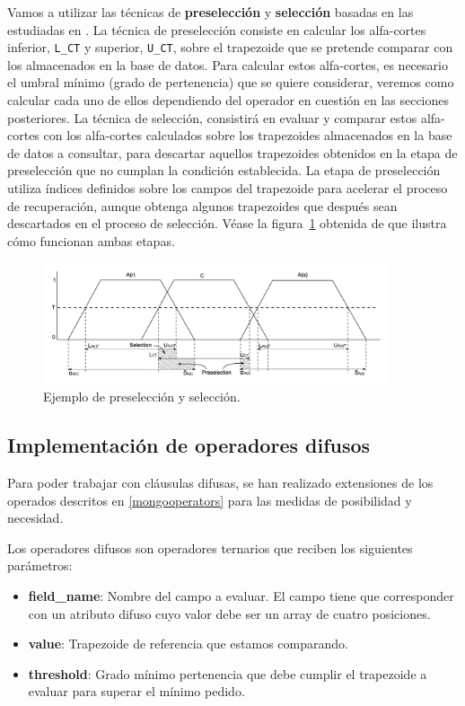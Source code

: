 Vamos a utilizar las técnicas de \textbf{preselección} y \textbf{selección} basadas en las estudiadas en \cite{indexingstrategies}. La técnica de preselección consiste en calcular los alfa-cortes inferior, \texttt{L\_CT} y superior, \texttt{U\_CT}, sobre el trapezoide que se pretende comparar con los almacenados en la base de datos. Para calcular estos alfa-cortes, es necesario el umbral mínimo (grado de pertenencia) que se quiere considerar, veremos como calcular cada uno de ellos dependiendo del operador en cuestión en las secciones posteriores. La técnica de selección, consistirá en evaluar y comparar estos alfa-cortes con los alfa-cortes calculados sobre los trapezoides almacenados en la base de datos a consultar, para descartar aquellos trapezoides obtenidos en la etapa de preselección que no cumplan la condición establecida. La etapa de preselección utiliza índices definidos sobre los campos del trapezoide para acelerar el proceso de recuperación, aunque obtenga algunos trapezoides que después sean descartados en el proceso de selección. Véase la figura~\ref{fig:preselection} obtenida de \cite{indexingstrategies} que ilustra cómo funcionan ambas etapas.

\begin{figure}[h]
  \centering
  \includegraphics[width=0.9\textwidth]{gfx/preselection.png}
  \caption{\label{fig:preselection}Ejemplo de preselección y selección.}
\end{figure}

\subsection{Implementación de operadores difusos}

Para poder trabajar con cláusulas difusas, se han realizado extensiones de los operados descritos en \ref{mongooperators} para las medidas de posibilidad y necesidad.

Los operadores difusos son operadores ternarios que reciben los siguientes parámetros:

\begin{itemize}
    \item \textbf{field\_name}: Nombre del campo a evaluar. El campo tiene que corresponder con un atributo difuso cuyo valor debe ser un array de cuatro posiciones. 
    \item \textbf{value}: Trapezoide de referencia que estamos comparando.
    \item \textbf{threshold}: Grado mínimo pertenencia que debe cumplir el trapezoide a evaluar para superar el mínimo pedido.
\end{itemize}

